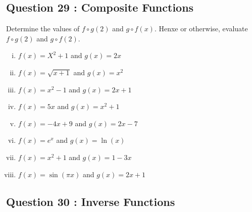 \documentclass[]{article}
\begin{document}
\subsection*{Question 29 : Composite Functions}
Determine the values of $f \circ g(2)$ and $g \circ f(x)$. Henxe or otherwise, evaluate $f \circ g(2)$ and $g \circ f(2)$.
\begin{multicols}{2}
	\begin{enumerate}[(i)]
		\item $f(x) = X^2 + 1$ and $g(x)= 2x$
		\item $f(x) = \sqrt{x+1}$ and $g(x)=x^2$
		\item $f(x) = x^2-1$ and $g(x) = 2x+1$
		
		\item $f(x) = 5x $ and $g(x)=x^2+1$
		\item $f(x) = -4x+9$ and $g(x) = 2x-7$
		\item $f(x) = e^x$ and $g(x)=\ln(x)$
		\item  $f(x) = x^2+1$ and $g(x) = 1-3x$
		\item $f(x) = \sin(\pi x)$ and $g(x) = 2x+1$
	\end{enumerate}	
\end{multicols}	
\medskip

\subsection*{Question 30 : Inverse Functions}
\end{document}
